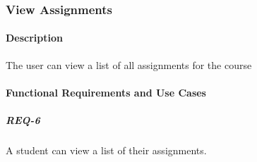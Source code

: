 \documentclass{article}
\begin{document}
\newpage

\subsubsection{View Assignments}

\paragraph{Description} The user can view a list of all assignments for the course

\paragraph{Functional Requirements and Use Cases}


\subparagraph{REQ-6} A student can view a list of their assignments.

\vspace{0.1in}
\end{document}
